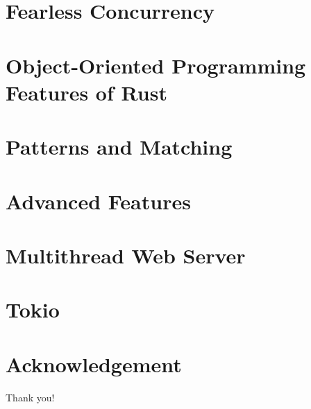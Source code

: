 \documentclass{beamer}
\begin{document}
\section{Fearless Concurrency}
\section{Object-Oriented Programming Features of Rust}
\section{Patterns and Matching}
\section{Advanced Features}
\section{Multithread Web Server}
\section{Tokio}

\section*{Acknowledgement}
\begin{frame}
	\Huge{\centerline{Thank you!}}
\end{frame}
\end{document}
